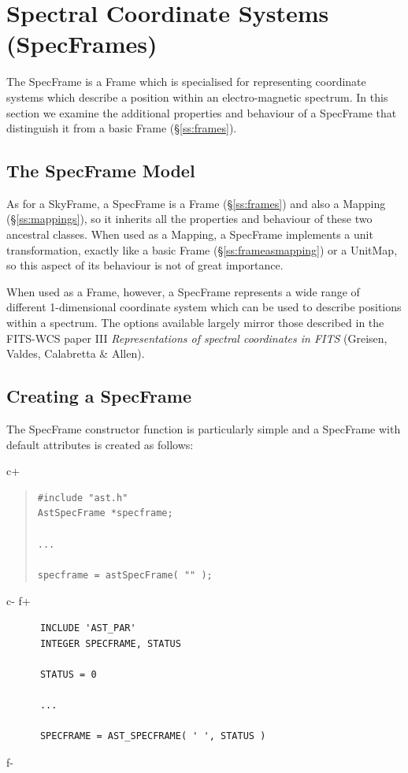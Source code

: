 \documentclass[twoside,11pt]{article}
\newcommand{\xlabel}[1]{}
\newcommand{\secref}[1]{\S\ref{#1}}
\newcommand{\secref}[1]{\ref{#1}}
\begin{document}
\cleardoublepage
\section{\xlabel{ss_specframes}\label{ss:specframes}Spectral Coordinate Systems (SpecFrames)}

The SpecFrame is a Frame which is specialised for representing coordinate 
systems which describe a position within an electro-magnetic spectrum.
In this section we examine the additional properties and behaviour of a 
SpecFrame that distinguish it from a basic Frame (\secref{ss:frames}).

\subsection{The SpecFrame Model}

As for a SkyFrame, a SpecFrame is a Frame (\secref{ss:frames}) and also a
Mapping (\secref{ss:mappings}), so it inherits all the properties and
behaviour of these two ancestral classes.  When used as a Mapping, a
SpecFrame implements a unit transformation, exactly like a basic Frame
(\secref{ss:frameasmapping}) or a UnitMap, so this aspect of its
behaviour is not of great importance.

When used as a Frame, however, a SpecFrame represents a wide range of
different 1-dimensional coordinate system which can be used to describe
positions within a spectrum. The options available largely mirror those
described in the FITS-WCS paper III \emph{Representations of spectral
coordinates in FITS} (Greisen, Valdes, Calabretta \& Allen).

\subsection{Creating a SpecFrame}

The SpecFrame constructor function is particularly simple and a
SpecFrame with default attributes is created as follows:

c+
\begin{quote}
\small
\begin{verbatim}
#include "ast.h"
AstSpecFrame *specframe;

...

specframe = astSpecFrame( "" );
\end{verbatim}
\normalsize
\end{quote}
c-
f+
\small
\begin{verbatim}
      INCLUDE 'AST_PAR'
      INTEGER SPECFRAME, STATUS

      STATUS = 0

      ...

      SPECFRAME = AST_SPECFRAME( ' ', STATUS )
\end{verbatim}
\normalsize
f-
\end{document}
